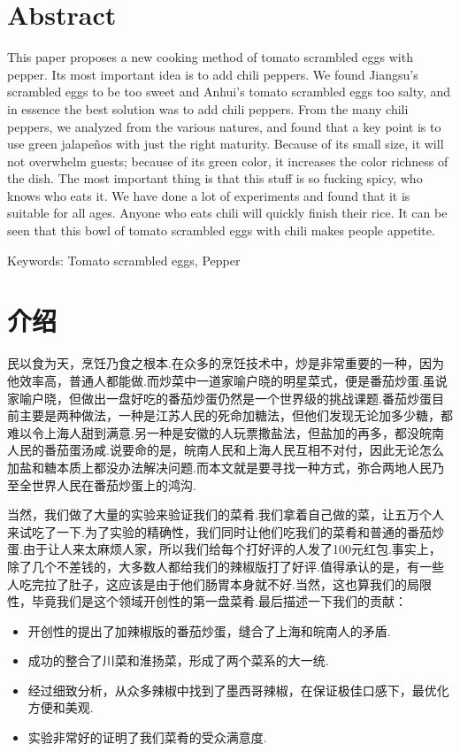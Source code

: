 \section*{Abstract}
This paper proposes a new cooking method of tomato scrambled eggs with pepper. Its most important idea is to add chili peppers. We found Jiangsu's scrambled eggs to be too sweet and Anhui's tomato scrambled eggs too salty, and in essence the best solution was to add chili peppers. From the many chili peppers, we analyzed from the various natures, and found that a key point is to use green jalapeños with just the right maturity. Because of its small size, it will not overwhelm guests; because of its green color, it increases the color richness of the dish. The most important thing is that this stuff is so fucking spicy, who knows who eats it. We have done a lot of experiments and found that it is suitable for all ages. Anyone who eats chili will quickly finish their rice. It can be seen that this bowl of tomato scrambled eggs with chili makes people appetite.

\vspace{1em}\noindent
{\hei Keywords:}
{\songti \rmfamily Tomato scrambled eggs, Pepper}

\clearpage



\setcounter{page}{1}
\section{介绍}
民以食为天，烹饪乃食之根本.在众多的烹饪技术中，炒是非常重要的一种，因为他效率高，普通人都能做.而炒菜中一道家喻户晓的明星菜式，便是番茄炒蛋.虽说家喻户晓，但做出一盘好吃的番茄炒蛋仍然是一个世界级的挑战课题.番茄炒蛋目前主要是两种做法，一种是江苏人民的死命加糖法，但他们发现无论加多少糖，都难以令上海人甜到满意.另一种是安徽的人玩票撒盐法，但盐加的再多，都没皖南人民的番茄蛋汤咸.说要命的是，皖南人民和上海人民互相不对付，因此无论怎么加盐和糖本质上都没办法解决问题.而本文就是要寻找一种方式，弥合两地人民乃至全世界人民在番茄炒蛋上的鸿沟.

当然，我们做了大量的实验来验证我们的菜肴.我们拿着自己做的菜，让五万个人来试吃了一下.为了实验的精确性，我们同时让他们吃我们的菜肴和普通的番茄炒蛋.由于让人来太麻烦人家，所以我们给每个打好评的人发了100元红包.事实上，除了几个不差钱的，大多数人都给我们的辣椒版打了好评.值得承认的是，有一些人吃完拉了肚子，这应该是由于他们肠胃本身就不好.当然，这也算我们的局限性，毕竟我们是这个领域开创性的第一盘菜肴.最后描述一下我们的贡献：
\begin{itemize}[leftmargin=*,noitemsep]
    \item 开创性的提出了加辣椒版的番茄炒蛋，缝合了上海和皖南人的矛盾.
    \item 成功的整合了川菜和淮扬菜，形成了两个菜系的大一统.
    \item 经过细致分析，从众多辣椒中找到了墨西哥辣椒，在保证极佳口感下，最优化方便和美观.
    \item 实验非常好的证明了我们菜肴的受众满意度.
\end{itemize}




